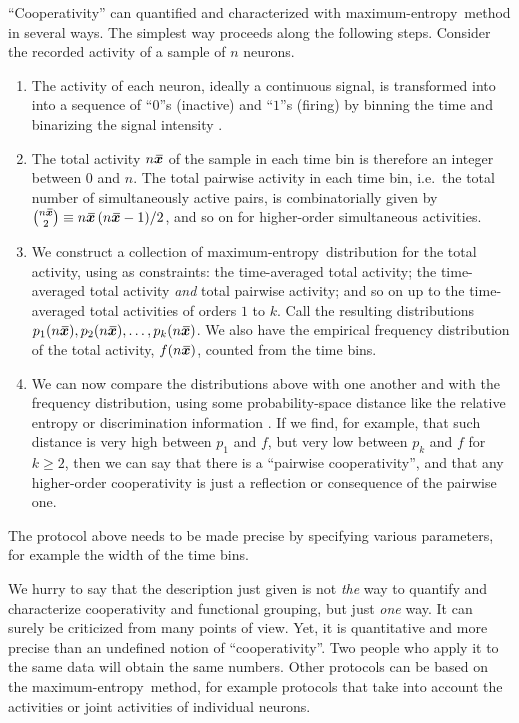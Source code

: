 \documentclass{article}
\theoremstyle{remark}
\theoremstyle{innote}
\newcommand*{\citep}{\parencites}
\renewcommand*{\cite}{\citep}
\renewcommand*{\|}{\mathpunct{|}}%
\renewcommand{\ge}{\geqslant}%
\newcommand*{\ie}{{i.e.}}
\theoremstyle{simple}
\newcommand*{\widebar}[1]{{\mkern1.5mu\skew{2}\overline{\mkern-1.5mu#1\mkern-1.5mu}\mkern 1.5mu}}
\newcommand*{\sav}{\widebar} %
\newcommand*{\yxx}{x}%
\newcommand*{\yx}{\bm{\yxx}}%
\newcommand*{\yxs}{\sav{\yx}}%
\newcommand*{\me}{maximum-entropy}
\begin{document}
\enquote{Cooperativity} can quantified and characterized with \me\ method
in several ways. The simplest way proceeds along the following steps.
Consider the recorded activity of a sample of $n$ neurons.
\begin{enumerate}
\item The activity of each neuron, ideally a continuous signal, is
  transformed into into a sequence of \enquote{$0$}s (inactive) and
  \enquote{$1$}s (firing) by binning the time and binarizing the signal
  intensity \cite{caianiello1961,caianiello1986}.

\item The total activity $n\yxs$ of the sample in each time bin is
  therefore an integer between $0$ and $n$. The total pairwise activity in
  each time bin, \ie\ the total number of simultaneously active pairs, is
  combinatorially given by $\tbinom{n\yxs}{2}\equiv n\yxs\,(n\yxs-1)/2$,
  and so on for higher-order simultaneous activities.

\item We construct a collection of \me\ distribution for the total
  activity, using as constraints: the time-averaged total activity; the
  time-averaged total activity \emph{and} total pairwise activity; and so
  on up to the time-averaged total activities of orders $1$ to $k$. Call
  the resulting distributions $p_1(n\yxs), p_2(n\yxs),\dotsc,p_k(n\yxs)$.
  We also have the empirical frequency distribution of the total activity,
  $f(n\yxs)$, counted from the time bins.

\item We can now compare the distributions above with one another and with
  the frequency distribution, using some probability-space distance like
  the relative entropy or discrimination information
  \citep{kullback1987,jaynes1963,hobson1969,hobsonetal1973}. If we find,
  for example, that such distance is very high between $p_1$ and $f$, but
  very low between $p_k$ and $f$ for $k \ge 2$, then we can say that there
  is a \enquote{pairwise cooperativity}, and that any higher-order
  cooperativity is just a reflection or consequence of the pairwise one.
\end{enumerate}
The protocol above needs to be made precise by specifying various
parameters, for example the width of the time bins.

We hurry to say that the description just given is not \emph{the} way to
quantify and characterize cooperativity and functional grouping, but just
\emph{one} way. It can surely be criticized from many points of view. Yet,
it is quantitative and more precise than an undefined notion of
\enquote{cooperativity}. Two people who apply it to the same data will
obtain the same numbers. Other protocols can be based on the \me\ method,
for example protocols that take into account the activities or joint
activities of individual neurons.
\end{document}
